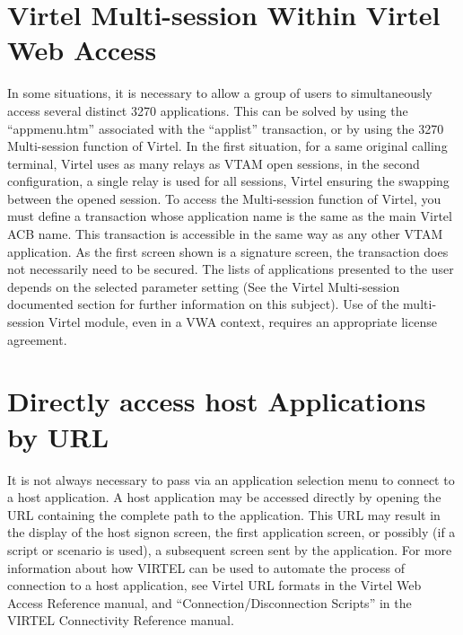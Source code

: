 \documentclass[letterpaper,10pt,english]{sphinxmanual}
\begin{document}
\section{Virtel Multi-session Within Virtel Web Access}
\label{\detokenize{Customization:virtel-multi-session-within-virtel-web-access}}\label{\detokenize{Customization:index-57}}
In some situations, it is necessary to allow a group of users to simultaneously access several distinct 3270 applications. This can be solved by using the “appmenu.htm” associated with the “applist” transaction, or by using the 3270 Multi-session function of Virtel. In the first situation, for a same original calling terminal, Virtel uses as many relays as VTAM open sessions, in the second configuration, a single relay is used for all sessions, Virtel ensuring the swapping between the opened session. To access the Multi-session function of Virtel, you must define a transaction whose application name is the same as the main Virtel ACB name. This transaction is accessible in the same way as any other VTAM application. As the first screen shown is a signature screen, the transaction does not necessarily need to be secured. The lists of applications presented to the user depends on the selected parameter setting (See the Virtel Multi-session documented section for further information on this subject). Use of the multi-session Virtel module, even in a VWA context, requires an appropriate license agreement.




\section{Directly access host Applications by URL}
\label{\detokenize{Customization:directly-access-host-applications-by-url}}
\ignorespaces 
It is not always necessary to pass via an application selection menu to connect to a host application. A host application may be accessed directly by opening the URL containing the complete path to the application. This URL may result in the display of the host signon screen, the first application screen, or possibly (if a script or scenario is used), a
subsequent screen sent by the application. For more information about how VIRTEL can be used to automate the process of connection to a host application, see Virtel URL formats in the Virtel Web Access Reference manual, and “Connection/Disconnection Scripts” in the VIRTEL Connectivity Reference manual.
\end{document}
